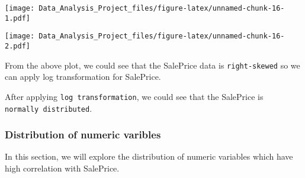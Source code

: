 \documentclass[]{article}
\newenvironment{Shaded}{\begin{snugshade}}{\end{snugshade}}
\newcommand{\KeywordTok}[1]{\textcolor[rgb]{0.13,0.29,0.53}{\textbf{#1}}}
\newcommand{\DataTypeTok}[1]{\textcolor[rgb]{0.13,0.29,0.53}{#1}}
\newcommand{\DecValTok}[1]{\textcolor[rgb]{0.00,0.00,0.81}{#1}}
\newcommand{\StringTok}[1]{\textcolor[rgb]{0.31,0.60,0.02}{#1}}
\newcommand{\CommentTok}[1]{\textcolor[rgb]{0.56,0.35,0.01}{\textit{#1}}}
\newcommand{\OperatorTok}[1]{\textcolor[rgb]{0.81,0.36,0.00}{\textbf{#1}}}
\newcommand{\NormalTok}[1]{#1}
\begin{document}
\texttt{[image: Data\_Analysis\_Project\_files/figure-latex/unnamed-chunk-16-1.pdf]}

\begin{Shaded}
\end{Shaded}

\texttt{[image: Data\_Analysis\_Project\_files/figure-latex/unnamed-chunk-16-2.pdf]}

From the above plot, we could see that the SalePrice data is
\texttt{right-skewed} so we can apply log transformation for SalePrice.

After applying \texttt{log\ transformation}, we could see that the
SalePrice is \texttt{normally\ distributed}.

\subsubsection{Distribution of numeric
varibles}\label{distribution-of-numeric-varibles}

In this section, we will explore the distribution of numeric variables
which have high correlation with SalePrice.
\end{document}
